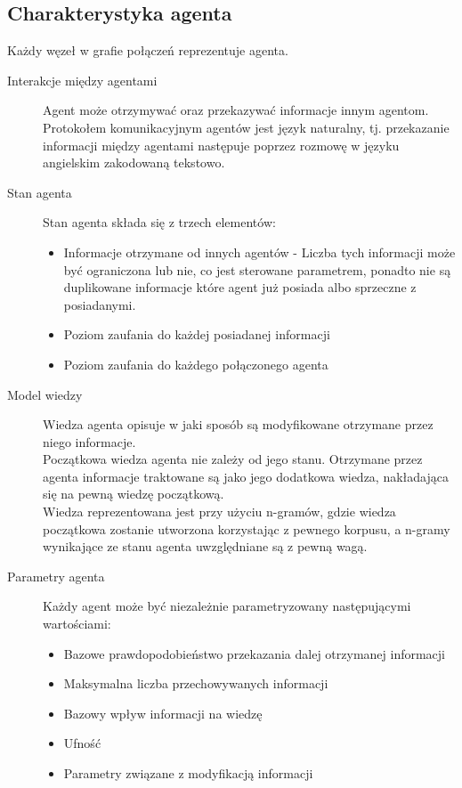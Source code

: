 \documentclass{article}
\begin{document}
	\subsection{Charakterystyka agenta}
	Każdy węzeł w grafie połączeń reprezentuje agenta.
	\begin{description}
		\item[Interakcje między agentami]
		Agent może otrzymywać oraz przekazywać informacje innym agentom.
		Protokołem komunikacyjnym agentów jest język naturalny, tj.
		przekazanie informacji między agentami następuje poprzez rozmowę
		w języku angielskim zakodowaną tekstowo.
		\item[Stan agenta]
		Stan agenta składa się z trzech elementów:
		\begin{itemize}
			\item {Informacje otrzymane od innych agentów - 
			Liczba tych informacji może być ograniczona lub nie, co jest sterowane parametrem,
			ponadto nie są duplikowane informacje które agent już posiada albo sprzeczne z posiadanymi.}
			\item {Poziom zaufania do każdej posiadanej informacji}
			\item {Poziom zaufania do każdego połączonego agenta}
		\end{itemize}
		\item[Model wiedzy]
		Wiedza agenta opisuje w jaki sposób są modyfikowane otrzymane przez niego informacje.\\
		Początkowa wiedza agenta nie zależy od jego stanu.
		Otrzymane przez agenta informacje traktowane są jako jego dodatkowa wiedza,
		nakładająca się na pewną wiedzę początkową.\\
		Wiedza reprezentowana jest przy użyciu n-gramów,
		gdzie wiedza początkowa zostanie utworzona korzystając z pewnego korpusu,
		a n-gramy wynikające ze stanu agenta uwzględniane są z pewną wagą.
		\item[Parametry agenta] Każdy agent może być niezależnie parametryzowany następującymi wartościami:
		\begin{itemize}
			\item{Bazowe prawdopodobieństwo przekazania dalej otrzymanej informacji}
			\item{Maksymalna liczba przechowywanych informacji}
			\item{Bazowy wpływ informacji na wiedzę}
			\item{Ufność}
			\item{Parametry związane z modyfikacją informacji}
		\end{itemize}
	\end{description}
\end{document}
